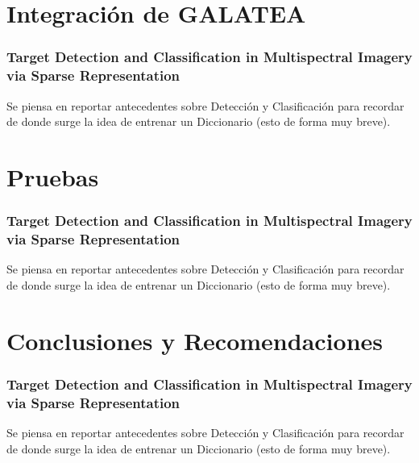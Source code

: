 \documentclass[spanish,xcolor=dvipsnames]{beamer}
\begin{document}
    \section{Integración de GALATEA}
    \begin{frame}
    	\frametitle{Target Detection and Classification in Multispectral Imagery via Sparse Representation}
    	
    	Se piensa en reportar antecedentes sobre Detección y Clasificación para recordar de donde surge la idea de entrenar un Diccionario (esto de forma muy breve). 
    	
    \end{frame}

    \section{Pruebas}
    \begin{frame}
        \frametitle{Target Detection and Classification in Multispectral Imagery via Sparse Representation}
   
   Se piensa en reportar antecedentes sobre Detección y Clasificación para recordar de donde surge la idea de entrenar un Diccionario (esto de forma muy breve). 
  
    \end{frame}
    
    \section{Conclusiones y Recomendaciones}
    \begin{frame}
    	\frametitle{Target Detection and Classification in Multispectral Imagery via Sparse Representation}
    	
    	Se piensa en reportar antecedentes sobre Detección y Clasificación para recordar de donde surge la idea de entrenar un Diccionario (esto de forma muy breve). 
    	
    \end{frame}
\end{document}
